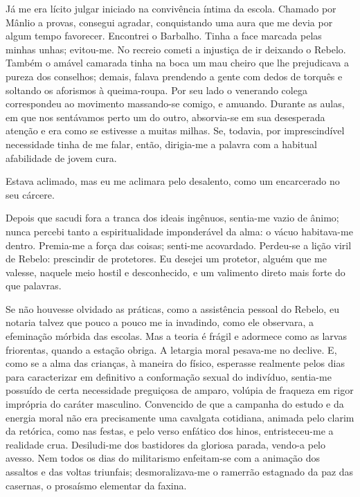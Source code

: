 Já me era lícito julgar iniciado na convivência íntima da
escola. Chamado por Mânlio a provas, consegui agradar, conquistando uma
aura que me devia por algum tempo favorecer. Encontrei o Barbalho.
Tinha a face marcada pelas minhas unhas; evitou{}-me. No recreio cometi
a injustiça de ir deixando o Rebelo. Também o amável camarada tinha na
boca um mau cheiro que lhe prejudicava a pureza dos conselhos; demais,
falava prendendo a gente com dedos de torquês e soltando os aforismos à
queima{}-roupa. Por seu lado o venerando colega correspondeu ao
movimento massando{}-se comigo, e amuando. Durante as aulas, em que nos
sentávamos perto um do outro, absorvia{}-se em sua desesperada atenção
e era como se estivesse a muitas milhas. Se, todavia, por
imprescindível necessidade tinha de me falar, então, dirigia{}-me a
palavra com a habitual afabilidade de jovem cura. 

Estava aclimado, mas eu me aclimara pelo desalento, como um encarcerado 
no seu cárcere. 

Depois que sacudi fora a tranca dos ideais ingênuos, sentia{}-me 
vazio de ânimo; nunca percebi tanto a espiritualidade imponderável da alma: o
vácuo habitava{}-me dentro. Premia{}-me a força das coisas; senti{}-me
acovardado. Perdeu{}-se a lição viril de Rebelo: prescindir de
protetores. Eu desejei um protetor, alguém que me valesse, naquele meio
hostil e desconhecido, e um valimento direto mais forte do que palavras. 

Se não houvesse olvidado as práticas, como a assistência
pessoal do Rebelo, eu notaria talvez que pouco a pouco me ia invadindo,
como ele observara, a efeminação mórbida das escolas. Mas a teoria é
frágil e adormece como as larvas friorentas, quando a estação obriga. A
letargia moral pesava{}-me no declive. E, como se a alma das crianças,
à maneira do físico, esperasse realmente pelos dias para caracterizar em 
definitivo a conformação sexual do indivíduo,
sentia{}-me possuído de certa necessidade preguiçosa de amparo, volúpia
de fraqueza em rigor imprópria do caráter masculino. Convencido de que
a campanha do estudo e da energia moral não era precisamente uma
cavalgata cotidiana, animada pelo clarim da retórica, como nas festas,
e pelo verso enfático dos hinos, entristeceu{}-me a realidade crua.
Desiludi{}-me dos bastidores da gloriosa parada, vendo{}-a pelo avesso.
Nem todos os dias do militarismo enfeitam{}-se com a animação dos
assaltos e das voltas triunfais; desmoralizava{}-me o ramerrão
estagnado da paz das casernas, o prosaísmo elementar da faxina. 

